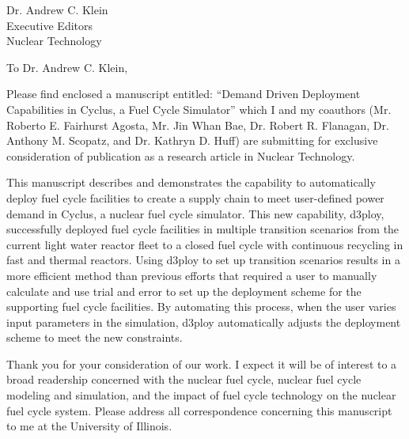 \documentclass[11pt]{letter} %
\newcommand{\RecipientName}{Dr. Andrew C. Klein\xspace}
\newcommand{\RecipientAddress}{Executive Editors\\Nuclear Technology}
\begin{document}
\small
\begin{letter}{\RecipientName\\
        \RecipientAddress\xspace}

\address{Gwendolyn J. Chee\\
gchee2@illinois.edu\\
226 Talbot Laboratory\\
104 Wright Street, MC-234\\
Urbana, IL 61801}


\opening{To \RecipientName,}

Please find enclosed a manuscript entitled: ``Demand Driven Deployment Capabilities in Cyclus, 
a Fuel Cycle Simulator'' which I and my 
coauthors (Mr. Roberto E. Fairhurst Agosta, Mr. Jin Whan Bae, 
Dr. Robert R. Flanagan, Dr. Anthony M. Scopatz, and Dr. Kathryn D. Huff) are submitting for 
exclusive consideration of publication as a research article in Nuclear Technology. 

This manuscript describes and demonstrates the capability to automatically deploy fuel cycle 
facilities to create a supply chain to meet user-defined power demand in Cyclus, 
a nuclear fuel cycle simulator.
This new capability, d3ploy, successfully deployed fuel cycle facilities in
multiple transition scenarios from the current light water reactor 
fleet to a closed fuel cycle with continuous recycling in fast and thermal reactors.
Using d3ploy to set up transition scenarios results in a more
efficient method than previous efforts that required a user to manually calculate
and use trial and error to set up the deployment scheme for the supporting
fuel cycle facilities. By automating this process, when the user varies input
parameters in the simulation, d3ploy automatically adjusts the deployment
scheme to meet the new constraints.

Thank you for your consideration of our work.  I expect it will be of interest
to a broad readership concerned with the nuclear fuel cycle, 
nuclear fuel cycle modeling and simulation, and the impact of fuel cycle 
technology on the nuclear fuel cycle system. 
Please address all correspondence concerning this manuscript to me at the University of Illinois.




\end{letter}
\end{document}
